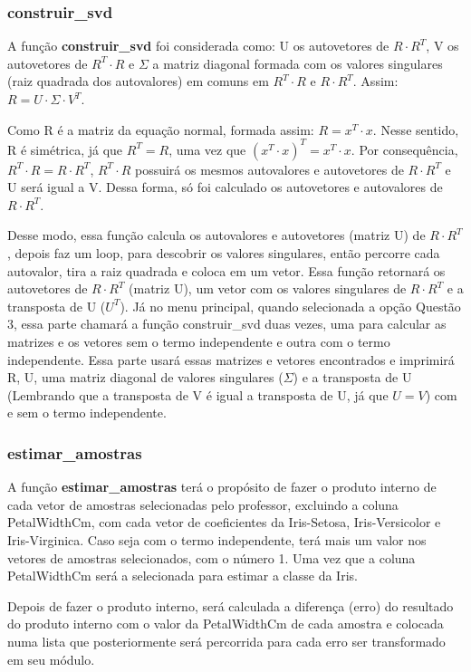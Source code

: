 \documentclass[a4paper,12pt,twoside]{article}
\begin{document}
\subsubsection{construir\_svd}
   A função \textbf{construir\_svd} foi considerada como: U os autovetores de $R\cdot R^{T}$, V os autovetores de $R^{T}\cdot
    R$ e $\Sigma$ a matriz diagonal formada com os valores singulares (raiz quadrada dos autovalores) em comuns em $R^{T}\cdot R$ e $R\cdot R^{T}$. Assim: $R = U\cdot \Sigma \cdot V^{T}$.
    
Como R é a matriz da equação normal, formada assim: $R = x^{T}\cdot x$. Nesse sentido, R é simétrica, já que $R^{T} = R$, uma vez que $(x^{T}\cdot x)^{T} = x^{T}\cdot x$. Por consequência, $R^{T}\cdot R = R\cdot R^{T}$, $R^{T}\cdot R$ possuirá os mesmos autovalores e autovetores de $R\cdot R^{T}$ e U será igual a V. Dessa forma, só foi calculado os autovetores e autovalores de $R\cdot R^{T}$.

Desse modo, essa função calcula os autovalores e autovetores (matriz U) de $R\cdot R^{T}$, depois faz um loop, para descobrir os valores singulares, então percorre cada  autovalor, tira a raiz quadrada e coloca em um vetor. Essa função retornará os autovetores de $R\cdot R^{T}$ (matriz U), um vetor com os valores singulares de $R\cdot R^{T}$ e a transposta de U ($U^T$). Já no menu principal, quando selecionada a opção Questão 3, essa parte chamará a função construir\_svd duas vezes, uma para calcular as matrizes e os vetores sem  o termo independente e outra com o termo independente. Essa parte usará essas matrizes e vetores encontrados e imprimirá R, U, uma matriz diagonal de valores singulares ($\Sigma$) e a transposta de U (Lembrando que a transposta de V é igual a transposta de U, já que $U = V$) com e sem o termo independente.

\subsubsection{estimar\_amostras}
A função \textbf{estimar\_amostras} terá o propósito de fazer o produto interno de cada vetor de amostras selecionadas pelo professor, excluindo a coluna PetalWidthCm, com cada vetor de coeficientes da Iris-Setosa, Iris-Versicolor e Iris-Virginica. Caso seja com o termo independente, terá mais um valor nos vetores de amostras selecionados, com o número 1. Uma vez que a coluna PetalWidthCm será a selecionada para estimar a classe da Iris. 

Depois de fazer o produto interno, será calculada a diferença (erro) do resultado do produto interno com o valor da PetalWidthCm de cada amostra e colocada numa lista que posteriormente será percorrida para cada erro ser transformado em seu módulo. 
\end{document}
